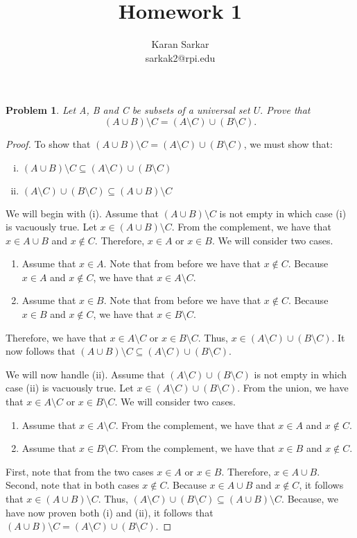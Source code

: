 \documentclass{article}
\title{Homework 1}
\author{Karan Sarkar \\ sarkak2@rpi.edu}
\newtheorem{problem}{Problem}
\begin{document}
\maketitle

\begin{problem}
 Let A, B and C be subsets of a universal set $U.$ Prove that 
 $$(A \cup B)\setminus C = (A \setminus C) \cup (B \setminus C).$$
\end{problem}
\begin{proof}
To show that $(A \cup B)\setminus C = (A \setminus C) \cup (B \setminus C)$, we must show that:
\begin{enumerate}[(i)]
    \item $(A \cup B)\setminus C \subseteq (A \setminus C) \cup (B \setminus C)$
    \item $(A \setminus C) \cup (B \setminus C) \subseteq (A \cup B)\setminus C$
\end{enumerate}
We will begin with (i). Assume that $(A \cup B)\setminus C$ is not empty in which case (i) is vacuously true. Let $x \in (A \cup B)\setminus C$. From the complement, we have that $x \in A \cup B$ and $x \not \in C$. Therefore, $x \in A$ or $x \in B$. We will consider two cases.
\begin{enumerate}
    \item Assume that $x \in A$. Note that from before we have that $x \not \in C$. Because $x \in A$ and $x \not \in C$, we have that $x \in A \setminus C$.
    \item Assume that $x \in B$. Note that from before we have that $x \not \in C$. Because $x \in B$ and $x \not \in C$, we have that $x \in B \setminus C$.
\end{enumerate}
Therefore, we have that $x \in A \setminus C$ or $x \in B \setminus C$. Thus, $x \in (A \setminus C) \cup (B \setminus C)$. It now follows that $(A \cup B)\setminus C \subseteq (A \setminus C) \cup (B \setminus C)$.

We will now handle (ii). Assume that $(A \setminus C) \cup (B \setminus C)$ is not empty in which case (ii) is vacuously true. Let $x \in (A \setminus C) \cup (B \setminus C)$. From the union, we have that $x \in A \setminus C$ or $x \in B \setminus C$. We will consider two cases.
\begin{enumerate}
    \item Assume that $x \in A \setminus C$. From the complement, we have that $x \in A$ and $x \not \in C$.
    \item Assume that $x \in B \setminus C$. From the complement, we have that $x \in B$ and $x \not \in C$.
\end{enumerate}
First, note that from the two cases $x \in A$ or $x \in B$. Therefore, $x \in A \cup B$. Second, note that in both cases $x \not \in C$. Because $x \in A \cup B$ and $x \not \in C$, it follows that $x \in (A \cup B)\setminus C$. Thus, $(A \setminus C) \cup (B \setminus C) \subseteq (A \cup B)\setminus C$. Because, we have now proven both (i) and (ii), it follows that $(A \cup B)\setminus C = (A \setminus C) \cup (B \setminus C)$.
\end{proof}
\end{document}

